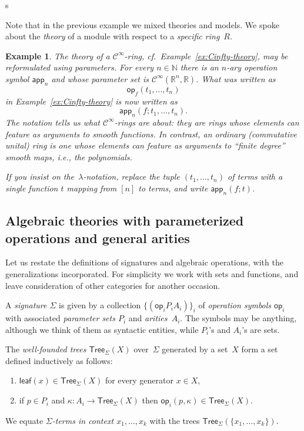 s\documentclass{amsart}
\newcommand{\NN}{\mathbb{N}} %
\newcommand{\RR}{\mathbb{R}} %
\newcommand{\set}[1]{\{#1\}} %
\newcommand{\family}[2]{\{#1\}_{#2}} %
\newcommand{\Tree}[2]{\mathsf{Tree}_{#1}(#2)} %
\newcommand{\leaf}[1]{\mathsf{leaf}(#1)} %
\newcommand{\op}[1]{\mathsf{op}_{#1}} %
\newcommand{\Cinfty}{\mathcal{C}^\infty}
\newtheorem{example}[definition]{Example}
\begin{document}
Note that in the previous example we mixed theories and models. We spoke about
the \emph{theory} of a module with respect to a \emph{specific ring}~$R$.

\begin{example}
  The theory of a $\Cinfty$-ring, cf.\ Example~\ref{ex:Cinfty-theory}, may be
  reformulated using parameters. For every $n \in \NN$ there is an $n$-ary
  operation symbol $\mathsf{app}_n$ and whose parameter set is
  $\Cinfty(\RR^n, \RR)$. What was written as
  \begin{equation*}
    \op{f}(t_1, \ldots, t_n)
  \end{equation*}
  in Example~\ref{ex:Cinfty-theory} is now written as
  \begin{equation*}
    \mathsf{app}_n(f; t_1, \ldots, t_n).
  \end{equation*}
  The notation tells us what $\Cinfty$-rings are about: they are rings whose
  elements can feature as arguments to smooth functions. In contrast, an
  ordinary (commutative unital) ring is one whose elements can feature as
  arguments to ``finite degree'' smooth maps, i.e., the polynomials.

  If you insist on the~$\lambda$-notation, replace the tuple
  $(t_1, \ldots, t_n)$ of terms with a single function $t$ mapping from $[n]$ to
  terms, and write $\mathsf{app}_n(f; t)$.
\end{example}


\subsection{Algebraic theories with parameterized operations and general arities}
\label{sec:algebr-theor-with}

Let us restate the definitions of signatures and algebraic operations, with the
generalizations incorporated. For simplicity we work with sets and functions,
and leave consideration of other categories for another occasion.

A \emph{signature $\Sigma$} is given by a collection
$\family{(\op{i}{P_i}{A_i})}{i}$ of \emph{operation symbols $\op{i}$} with
associated \emph{parameter sets $P_i$} and \emph{arities~$A_i$}. The symbols may
be anything, although we think of them as syntactic entities, while $P_i$'s and
$A_i$'s are sets.

The \emph{well-founded trees $\Tree{\Sigma}{X}$} over~$\Sigma$ generated by a
set~$X$ form a set defined inductively as follows:
%
\begin{enumerate}
\item $\leaf{x} \in \Tree{\Sigma}{X}$ for every generator $x \in X$,
\item if $p \in P_i$ and $\kappa : A_i \to \Tree{\Sigma}{X}$ then
  $\op{i}(p, \kappa) \in \Tree{\Sigma}{X}$.
\end{enumerate}
%
We equate \emph{$\Sigma$-terms in context $x_1, \ldots, x_k$} with the trees
$\Tree{\Sigma}{\set{x_1, \ldots, x_k}}$.
\end{document}
